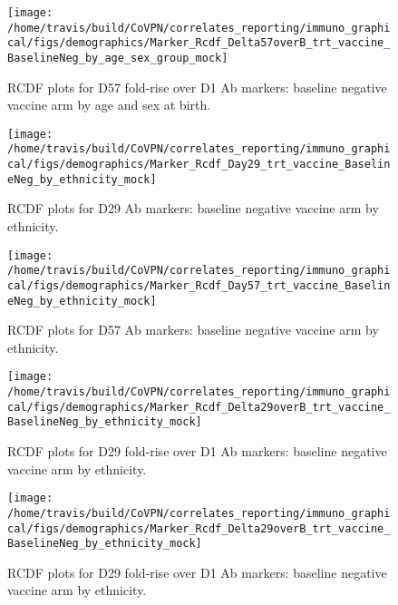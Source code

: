 \documentclass[]{book}
\theoremstyle{definition}
\theoremstyle{definition}
\theoremstyle{definition}
\newcommand{\1}{\mathbbm{1}}
\begin{document}
\begin{figure}[H]

{\centering \texttt{[image: /home/travis/build/CoVPN/correlates\_reporting/immuno\_graphical/figs/demographics/Marker\_Rcdf\_Delta57overB\_trt\_vaccine\_BaselineNeg\_by\_age\_sex\_group\_mock]} 

}

\caption{RCDF plots for D57 fold-rise over D1 Ab markers: baseline negative vaccine arm by age and sex at birth.}\label{fig:unnamed-chunk-74}
\end{figure}

\begin{figure}[H]

{\centering \texttt{[image: /home/travis/build/CoVPN/correlates\_reporting/immuno\_graphical/figs/demographics/Marker\_Rcdf\_Day29\_trt\_vaccine\_BaselineNeg\_by\_ethnicity\_mock]} 

}

\caption{RCDF plots for D29 Ab markers: baseline negative vaccine arm by ethnicity.}\label{fig:unnamed-chunk-75}
\end{figure}

\begin{figure}[H]

{\centering \texttt{[image: /home/travis/build/CoVPN/correlates\_reporting/immuno\_graphical/figs/demographics/Marker\_Rcdf\_Day57\_trt\_vaccine\_BaselineNeg\_by\_ethnicity\_mock]} 

}

\caption{RCDF plots for D57 Ab markers: baseline negative vaccine arm by ethnicity.}\label{fig:unnamed-chunk-76}
\end{figure}

\begin{figure}[H]

{\centering \texttt{[image: /home/travis/build/CoVPN/correlates\_reporting/immuno\_graphical/figs/demographics/Marker\_Rcdf\_Delta29overB\_trt\_vaccine\_BaselineNeg\_by\_ethnicity\_mock]} 

}

\caption{RCDF plots for D29 fold-rise over D1 Ab markers: baseline negative vaccine arm by ethnicity.}\label{fig:unnamed-chunk-77}
\end{figure}

\begin{figure}[H]

{\centering \texttt{[image: /home/travis/build/CoVPN/correlates\_reporting/immuno\_graphical/figs/demographics/Marker\_Rcdf\_Delta29overB\_trt\_vaccine\_BaselineNeg\_by\_ethnicity\_mock]} 

}

\caption{RCDF plots for D29 fold-rise over D1 Ab markers: baseline negative vaccine arm by ethnicity.}\label{fig:unnamed-chunk-78}
\end{figure}
\end{document}
